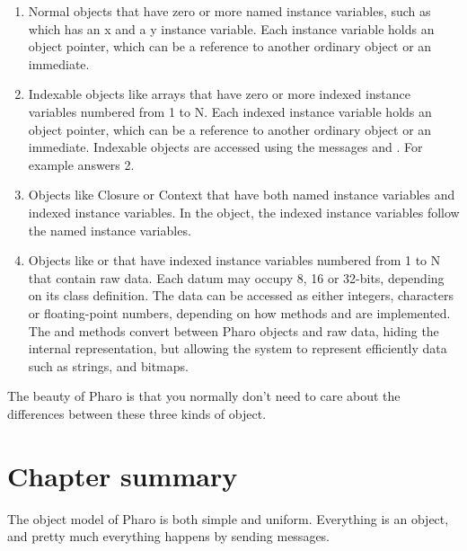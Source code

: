 \documentclass[10pt,twoside,english]{_support/latex/sbabook/sbabook}
\begin{document}
\begin{enumerate}
\item Normal objects that have zero or more named instance variables, such as  which has an x and a y instance variable. Each instance variable holds an object pointer, which can be a reference to another ordinary object or an immediate.
\item Indexable objects like arrays that have zero or more indexed instance variables numbered from 1 to N. Each indexed instance variable holds an object pointer, which can be a reference to another ordinary object or an immediate.  Indexable objects are accessed using the messages  and . For example  answers 2.
\item Objects like Closure or Context that have both named instance variables and indexed instance variables. In the object, the indexed instance variables follow the named instance variables.
\item Objects like  or  that have indexed instance variables numbered from 1 to N that contain raw data. Each datum may occupy 8, 16 or 32-bits, depending on its class definition. The data can be accessed as either integers, characters or floating-point numbers, depending on how methods  and  are implemented. The  and  methods convert between Pharo objects and raw data, hiding the internal representation, but allowing the system to represent efficiently data such as strings, and bitmaps.
\end{enumerate}

The beauty of Pharo is that you normally don't need to care about the
differences between these three kinds of object.
\chapter{Chapter summary}
The object model of Pharo is both simple and uniform.
Everything is an object, and pretty much everything happens by sending messages.
\end{document}
